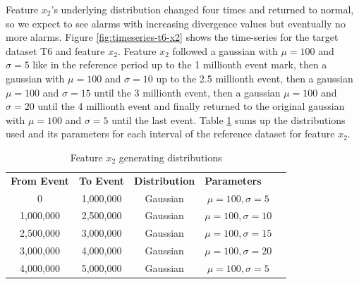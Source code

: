 \documentclass[sigconf]{acmart}
\begin{document}
Feature $x_2$'s underlying distribution changed four times and returned to normal, so we expect to see alarms with increasing divergence values but eventually no more alarms. Figure \ref{fig:timeseries-t6-x2} shows the time-series for the target dataset T6 and feature $x_2$. Feature $x_2$ followed a gaussian with $\mu=100$ and $\sigma=5$ like in the reference period up to the 1 millionth event mark, then a gaussian with $\mu=100$ and $\sigma=10$ up to the 2.5 millionth event, then a gaussian $\mu=100$ and $\sigma=15$ until the 3 millionth event, then a gaussian $\mu=100$ and $\sigma=20$ until the 4 millionth event and finally returned to the original gaussian with $\mu=100$ and $\sigma=5$ until the last event. Table \ref{tbl:multi-feat-x2-changes} sums up the distributions used and its parameters for each interval of the reference dataset for feature $x_2$.
\begin{table}[!htb]
    \begin{center}
    \begin{tabular}{|c|c|c|c|l}
    \cline{1-4}
    \textbf{From Event} & \textbf{To Event} & \textbf{Distribution} & \multicolumn{1}{l|}{\textbf{Parameters}} &  \\ \cline{1-4}
    0                   & 1,000,000         & Gaussian              & $\mu=100, \sigma=5$                      &  \\ \cline{1-4}
    1,000,000           & 2,500,000         & Gaussian              & $\mu=100, \sigma=10$                     &  \\ \cline{1-4}
    2,500,000           & 3,000,000         & Gaussian              & $\mu=100, \sigma=15$                     &  \\ \cline{1-4}
    3,000,000           & 4,000,000         & Gaussian              & $\mu=100, \sigma=20$                      &  \\ \cline{1-4}
    4,000,000           & 5,000,000         & Gaussian              & $\mu=100, \sigma=5$                      &  \\ \cline{1-4}
    \end{tabular}
    \end{center}
    \caption{Feature $x_2$ generating distributions}
    \label{tbl:multi-feat-x2-changes}
\end{table}
\end{document}
